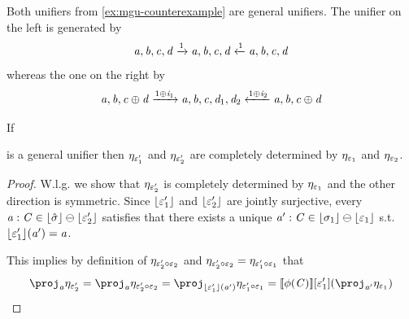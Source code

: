 \begin{example}
    Both unifiers from \cref{ex:mgu-counterexample} are general unifiers.
    The unifier on the left is generated by 
        \[ \mathit{a},\mathit{b},\mathit{c},\mathit{d} \xrightarrow{1} \mathit{a},\mathit{b},\mathit{c},\mathit{d} \xleftarrow{1} \mathit{a},\mathit{b},\mathit{c},\mathit{d} \]
    whereas the one on the right by 
        \[ \mathit{a},\mathit{b},\mathit{c} \oplus \mathit{d} \xrightarrow{1 \oplus \mathit{i}_1} \mathit{a},\mathit{b},\mathit{c},\mathit{d}_1,\mathit{d}_2 \xleftarrow{1 \oplus \mathit{i}_2} \mathit{a},\mathit{b},\mathit{c} \oplus \mathit{d} \]
\end{example}

\begin{lemma}\label{lem:general-unifier-data}
    If 
    is a general unifier then $\eta_{\varepsilon_1'}$ and $\eta_{\varepsilon_2'}$
    are completely determined by $\eta_{\varepsilon_1}$ and $\eta_{\varepsilon_2}$.
\end{lemma}
\begin{proof}
    W.l.g. we show that $\eta_{\varepsilon_2'}$ is completely determined by $\eta_{\varepsilon_1}$ and the other direction is symmetric.
    Since $\lfloor\varepsilon_1'\rfloor$ and $\lfloor\varepsilon_2'\rfloor$ are jointly surjective, every $\mathit{a} : \mathit{C} \in \lfloor\hat\sigma\rfloor \ominus \lfloor\varepsilon_2'\rfloor$
    satisfies that there exists a unique $\mathit{a}' : \mathit{C} \in \lfloor\sigma_1\rfloor \ominus \lfloor\varepsilon_1\rfloor$ s.t. $\lfloor\varepsilon_1'\rfloor(\mathit{a}') = \mathit{a}$. 

    This implies by definition of $\eta_{\varepsilon_2' \circ \varepsilon_2}$ and $\eta_{\varepsilon_2' \circ \varepsilon_2} = \eta_{\varepsilon_1' \circ \varepsilon_1}$ that
    \[ \proj_\va \mvarM_{\me_2'} = \proj_\va \mvarM_{\me_2' \comp \me_2} = \proj_{\concL{\me_1'}(\va')} \mvarM_{\me_1' \comp \me_1} = \sem{\phi(\vC)}\anyL{\me_1'}(\proj_{\va'} \mvarM_{\me_1}) \]
\end{proof}

